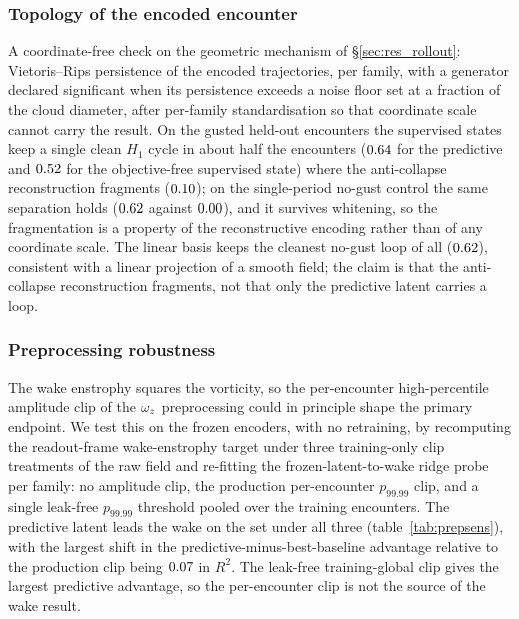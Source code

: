 \subsubsection*{Topology of the encoded encounter}
A coordinate-free check on the geometric mechanism of \S\ref{sec:res_rollout}:
Vietoris--Rips persistence of the encoded trajectories, per family, with a
generator declared significant when its persistence exceeds a noise floor set at
a fraction of the cloud diameter, after per-family standardisation so that
coordinate scale cannot carry the result. On the gusted held-out encounters the
supervised states keep a single clean $H_1$ cycle in about half the encounters
($0.64$ for the predictive and $0.52$ for the
objective-free supervised state) where the anti-collapse reconstruction
fragments ($0.10$); on the single-period no-gust control the same
separation holds ($0.62$ against $0.00$), and it survives
whitening, so the fragmentation is a property of the reconstructive encoding
rather than of any coordinate scale. The linear basis keeps the cleanest no-gust
loop of all ($0.62$), consistent with a linear projection of a smooth
field; the claim is that the anti-collapse reconstruction fragments, not that
only the predictive latent carries a loop.\re

\subsubsection*{Preprocessing robustness}
The wake enstrophy squares the vorticity, so the per-encounter high-percentile
amplitude clip of the $\omega_z$ preprocessing could in principle shape the primary
endpoint. We test this on the frozen encoders, with no retraining, by recomputing
the readout-frame wake-enstrophy target under three training-only clip treatments of
the raw field and re-fitting the frozen-latent-to-wake ridge probe per family: no
amplitude clip, the production per-encounter $p_{99.99}$ clip, and a single
leak-free $p_{99.99}$ threshold pooled over the training encounters. The predictive
latent leads the wake on the \TestSplit{} set under all three (table~\ref{tab:prepsens}), with
the largest shift in the predictive-minus-best-baseline advantage relative to the
production clip being $0.07$ in $R^2$. The leak-free training-global
clip gives the largest predictive advantage, so the per-encounter clip is not the
source of the wake result.\re

